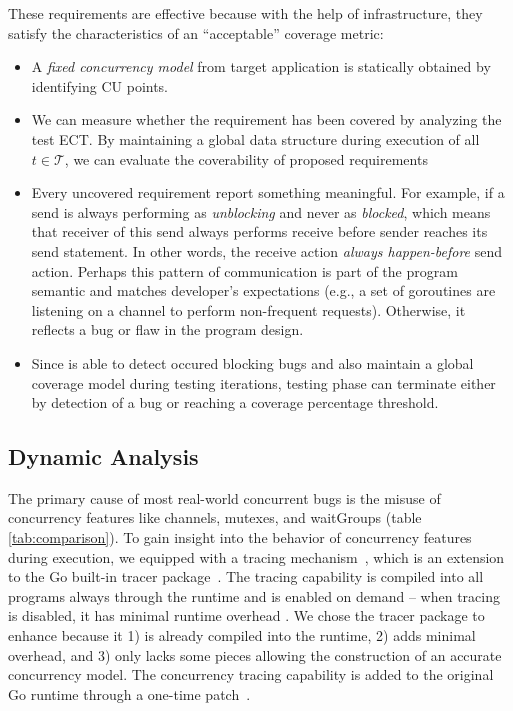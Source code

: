 These requirements are effective because with the help of \goat infrastructure, they satisfy the characteristics of an ``acceptable'' coverage metric:
\begin{itemize}
  \item A \textit{fixed concurrency model} from target application is statically obtained by identifying CU points.
  \item We can measure whether the requirement has been covered by analyzing the test ECT. By maintaining a global data structure during execution of all $t \in \mathcal{T}$, we can evaluate the coverability of proposed requirements
  \item Every uncovered requirement report something meaningful. For example, if a send is always performing as \textit{unblocking} and never as \textit{blocked}, which means that receiver of this send always performs receive before sender reaches its send statement. In other words, the receive action \textit{always happen-before} send action. Perhaps this pattern of communication is part of the program semantic and matches developer's expectations (e.g., a set of goroutines are listening on a channel to perform non-frequent requests). Otherwise, it reflects a bug or flaw in the program design.
  \item Since \goat is able to detect occured blocking bugs and also maintain a global coverage model during testing iterations, testing phase can terminate either by detection of a bug or reaching a coverage percentage threshold.
\end{itemize}


\subsection{Dynamic Analysis}
\label{sec:dynamic_analysis}
The primary cause of most real-world concurrent bugs is the misuse of concurrency features like channels, mutexes, and waitGroups (table \ref{tab:comparison}).
%
To gain insight into the behavior of concurrency features during execution, we equipped \goat with a tracing mechanism~\cite{ect-arxiv}, which is an extension to the Go built-in tracer package~\cite{go-cmd-trace}.
%
The tracing capability is compiled into all programs always through the runtime and is enabled on demand -- when tracing is disabled, it has minimal runtime overhead \cite{go-exec-tracer-doc}.
%
We chose the tracer package to enhance because it 1) is already compiled into the runtime, 2) adds minimal overhead, and 3) only lacks some pieces allowing the construction of an accurate concurrency model.
%
The concurrency tracing capability is added to the original Go runtime through a one-time patch~\cite{ect-patch}.

